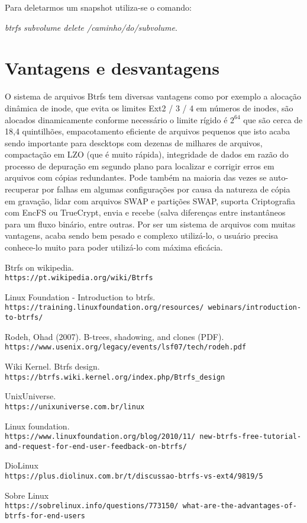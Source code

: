 \documentclass[12pt]{article}
\begin{document}
Para deletarmos um snapshot utiliza-se o comando:

\textit{btrfs subvolume delete /caminho/do/subvolume}.

\newpage
\section{Vantagens e desvantagens}

O sistema de arquivos Btrfs tem diversas vantagens como por exemplo a alocação dinâmica de inode, que evita os limites Ext2 / 3 / 4 em números de inodes, são alocados dinamicamente conforme necessário o limite rígido é $2^{64}$ que são cerca de 18,4 quintilhões, empacotamento eficiente de arquivos pequenos que isto acaba sendo importante para descktops com dezenas de milhares de arquivos, compactação em LZO (que é muito rápida), integridade de dados em razão do processo de depuração em segundo plano para localizar e corrigir erros em arquivos com cópias redundantes. Pode também na maioria das vezes se auto-recuperar por falhas em algumas configurações por causa da natureza de cópia em gravação, lidar com arquivos SWAP e partições SWAP, suporta Criptografia com EncFS ou TrueCrypt, envia e recebe (salva diferenças entre instantâneos para um fluxo binário, entre outras. Por ser um sistema de arquivos com muitas vantagens, acaba sendo bem pesado e complexo utilizá-lo, o usuário precisa conhece-lo muito para poder utilizá-lo com máxima eficácia.

\newpage
\begin{thebibliography}{9}

Btrfs on wikipedia.
\\\texttt{https://pt.wikipedia.org/wiki/Btrfs}

Linux Foundation - Introduction to btrfs.
\\\texttt{https://training.linuxfoundation.org/resources/\
webinars/introduction-to-btrfs/}

Rodeh, Ohad (2007). B-trees, shadowing, and clones (PDF). 
\\\texttt{https://www.usenix.org/legacy/events/lsf07/tech/rodeh.pdf}

Wiki Kernel. Btrfs design.
\\\texttt{https://btrfs.wiki.kernel.org/index.php/Btrfs_design}

UnixUniverse.
\\\texttt{https://unixuniverse.com.br/linux}

Linux foundation.
\\\texttt{https://www.linuxfoundation.org/blog/2010/11/\
new-btrfs-free-tutorial-and-request-for-end-user-feedback-on-btrfs/}

\bibitem{DioLinux}
DioLinux
\\\texttt{https://plus.diolinux.com.br/t/discussao-btrfs-vs-ext4/9819/5}

\bibitem{Sobre Linux}
Sobre Linux
\\\texttt{https://sobrelinux.info/questions/773150/\
what-are-the-advantages-of-btrfs-for-end-users}

\end{thebibliography}
\end{document}
